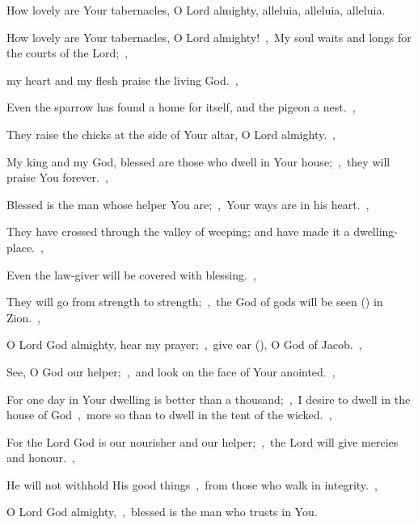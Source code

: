 \documentclass[12pt,twoside,a5paper]{article}
\begin{document}

\begin{halfparskip}
  How lovely are Your tabernacles, O Lord almighty, alleluia, alleluia, alleluia.

  How lovely are Your tabernacles, O Lord almighty!~\sep\ My soul waits and longs for the courts of the Lord;~\sep

  my heart and my flesh praise the living God.~\sep

  Even the sparrow has found a home for itself, and the pigeon a nest.~\sep

  They raise the chicks at the side of Your altar, O Lord almighty.~\sep

  My king and my God, blessed are those who dwell in Your house;~\sep\ they will praise You forever.~\sep

  Blessed is the man whose helper You are;~\sep\ Your ways are in his heart.~\sep

  They have crossed through the valley of weeping; and have made it a dwelling-place.~\sep

  Even the law-giver will be covered with blessing.~\sep

  They will go from strength to strength;~\sep\ the God of gods will be seen () in Zion.~\sep

  O Lord God almighty, hear my prayer;~\sep\ give ear (), O God of Jacob.~\sep

  See, O God our helper;~\sep\ and look on the face of Your anointed.~\sep

  For one day in Your dwelling is better than a thousand;~\sep\ I desire to dwell in the house of God~\sep\ more so than to dwell in the tent of the wicked.~\sep

  For the Lord God is our nourisher and our helper;~\sep\ the Lord will give mercies and honour.~\sep

  He will not withhold His good things~\sep\ from those who walk in integrity.~\sep

  O Lord God almighty,~\sep\ blessed is the man who trusts in You.
\end{halfparskip}

\end{document}
